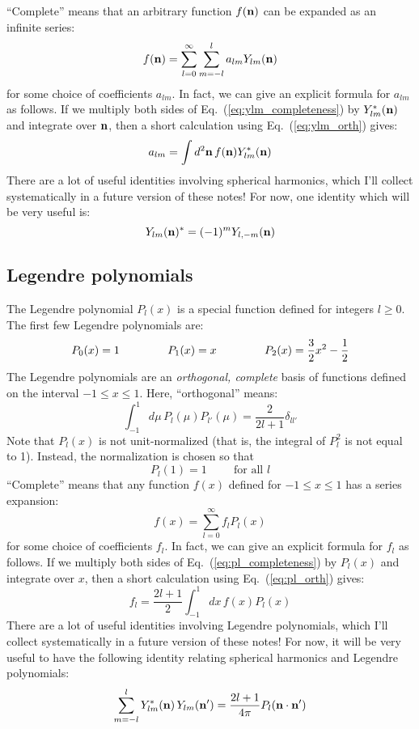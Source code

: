 \documentclass[aps,prd,superscriptaddress,groupedaddress,nofootinbib,nobibnotes]{revtex4}
\newcommand{\be}{\begin{equation}}
\newcommand{\ee}{\end{equation}}
\def\n{{\bf n}}
\begin{document}
``Complete'' means that an arbitrary function $f(\n)$ can be expanded as an infinite series:
\be
f(\n) = \sum_{l=0}^\infty \sum_{m=-l}^l a_{lm} Y_{lm}(\n)  \label{eq:ylm_completeness}
\ee
for some choice of coefficients $a_{lm}$.  In fact, we can give an explicit formula for $a_{lm}$ as follows.  
If we multiply both sides of Eq.~(\ref{eq:ylm_completeness})
by $Y_{lm}^*(\n)$ and integrate over $\n$, then a short calculation using Eq.~(\ref{eq:ylm_orth}) gives:
\be
a_{lm} = \int d^2\n \, f(\n) Y_{lm}^*(\n)
\ee
There are a lot of useful identities involving spherical harmonics, which I'll collect systematically
in a future version of these notes!  For now, one identity which will be very useful is:
\be
Y_{lm}(\n)^* = (-1)^m Y_{l,-m}(\n)
\ee

\subsection{Legendre polynomials}

The Legendre polynomial $P_l(x)$ is a special function defined for integers $l \ge 0$.
The first few Legendre polynomials are:
\be
P_0(x) = 1
  \hspace{1.5cm}
P_1(x) = x
  \hspace{1.5cm}
P_2(x) = \frac{3}{2}x^2 - \frac{1}{2}
\ee
The Legendre polynomials are an {\em orthogonal, complete} basis of functions defined on the interval $-1 \le x \le 1$.
Here, ``orthogonal'' means:
\be
\int_{-1}^1 d\mu \, P_l(\mu) P_{l'}(\mu) = \frac{2}{2l+1} \delta_{ll'}  \label{eq:pl_orth}
\ee
Note that $P_l(x)$ is not unit-normalized (that is, the integral of $P_l^2$ is not equal to 1).
Instead, the normalization is chosen so that
\be
P_l(1) = 1 \hspace{1cm} \mbox{for all $l$}
\ee
``Complete'' means that any function $f(x)$ defined for $-1 \le x \le 1$ has a series expansion:
\be
f(x) = \sum_{l=0}^\infty f_l P_l(x)  \label{eq:pl_completeness}
\ee
for some choice of coefficients $f_l$.
In fact, we can give an explicit formula for $f_l$ as follows.  
If we multiply both sides of Eq.~(\ref{eq:pl_completeness})
by $P_l(x)$ and integrate over $x$, then a short calculation using Eq.~(\ref{eq:pl_orth}) gives:
\be
f_l = \frac{2l+1}{2} \int_{-1}^1 dx \, f(x) P_l(x)
\ee
There are a lot of useful identities involving Legendre polynomials, which I'll collect systematically
in a future version of these notes!  For now, it will be very useful to have the following identity
relating spherical harmonics and Legendre polynomials:
\be
\sum_{m=-l}^l Y_{lm}^*(\n) \, Y_{lm}(\n') = \frac{2l+1}{4\pi} P_l(\n\cdot\n')
\ee
\end{document}
